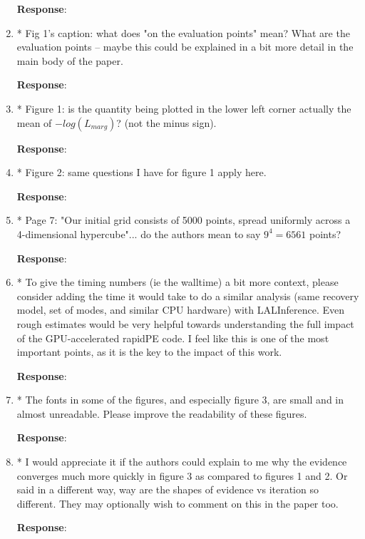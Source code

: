 \documentclass[onecolumn]{revtex4}
\begin{document}
\begin{enumerate}
\noindent \textbf{Response}:

\item * Fig 1's caption: what does "on the evaluation points" mean? What are
the evaluation points -- maybe this could be explained in a bit more
detail in the main body of the paper.

\noindent \textbf{Response}:

\item * Figure 1: is the quantity being plotted in the lower left corner
actually the mean of $-log(L_{marg})$? (not the minus sign).

\noindent \textbf{Response}:

\item * Figure 2: same questions I have for figure 1 apply here.

\noindent \textbf{Response}:

\item * Page 7: "Our initial grid consists of 5000 points, spread uniformly
across a 4-dimensional hypercube"... do the authors mean to say $9^4 =
6561$ points?

\noindent \textbf{Response}:

\item * To give the timing numbers (ie the walltime) a bit more context,
please consider adding the time it would take to do a similar analysis
(same recovery model, set of modes, and similar CPU hardware) with
LALInference. Even rough estimates would be very helpful towards
understanding the full impact of the GPU-accelerated rapidPE code. I
feel like this is one of the most important points, as it is the key
to the impact of this work.

\noindent \textbf{Response}:


\item * The fonts in some of the figures, and especially figure 3, are small
and in almost unreadable. Please improve the readability of these
figures.

\noindent \textbf{Response}:


\item * I would appreciate it if the authors could explain to me why the
evidence converges much more quickly in figure 3 as compared to
figures 1 and 2. Or said in a different way, way are the shapes of
evidence vs iteration so different. They may optionally wish to
comment on this in the paper too.

\noindent \textbf{Response}:

\end{enumerate}
\end{document}

